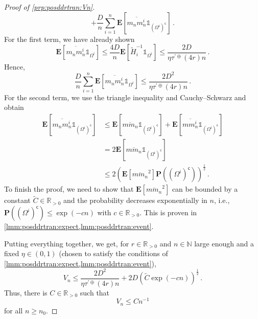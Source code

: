 \documentclass{article}
\newcommand{\N}{\mathbb{N}}
\newcommand{\R}{\mathbb{R}}
\newcommand{\Rpp}{\R_{>0}}
\newcommand{\lab}{\left[} %
\newcommand{\rab}{\right]} %
\newcommand{\ab}[1]{\lab #1 \rab} %
\newcommand{\abOf}[1]{\!\ab{#1}} %
\newcommand{\lb}{\left(} %
\newcommand{\rb}{\right)} %
\newcommand{\br}[1]{\lb #1 \rb} %
\newcommand{\brOf}[1]{\!\br{#1}} %
\renewcommand{\Pr}{\mathbf{P}} %
\newcommand{\PrOf}[1]{\Pr\brOf{#1}}
\newcommand{\E}{\mathbf{E}} %
\newcommand{\EOf}[1]{\E\abOf{#1}}
\newcommand{\compl}{^\mathsf{c}}%
\newcommand{\ind}{\mathds{1}}%
\newcommand{\eqfs}{\,.}
\newcommand{\ol}[2]{\overline{#1#2}}
\newcommand{\ddrtran}{\tau^{\prime\oplus}}
\begin{document}
\begin{proof}[Proof of \cref{prp:posddrtran:Vn}]
\begin{equation}
        +
        \frac D{n}\sum_{i=1}^n \EOf{\ol{m_n}{m_n^{i}} \ind_{(\Omega^i)\compl}}
        \eqfs
    \end{equation}
    For the first term, we have already shown
    \begin{equation}
        \EOf{\ol{m_n}{m_n^{i}} \ind_{\Omega^i}}
        \leq 
        \frac{4D}{n}\EOf{\tilde H_i^{-1} \ind_{\Omega^i}}
        \leq 
        \frac{2D}{\eta\ddrtran(4r)n}
        \eqfs
    \end{equation}
    Hence, 
    \begin{equation}
        \frac D{n}\sum_{i=1}^n \EOf{\ol{m_n}{m_n^{i}} \ind_{\Omega^i}} \leq \frac{2D^2}{\eta\ddrtran(4r)n}
        \eqfs
    \end{equation}
    For the second term, we use the triangle inequality and Cauchy--Schwarz and obtain
    \begin{align}
        \EOf{\ol{m_n}{m_n^{i}} \ind_{(\Omega^i)\compl}}
        &\leq 
        \EOf{\ol{m}{m_n} \ind_{(\Omega^i)\compl}}
        +
        \EOf{\ol{m}{m_n^{i}} \ind_{(\Omega^i)\compl}}
        \\&=
        2 \EOf{\ol{m}{m_n} \ind_{(\Omega^i)\compl}}
        \\&\leq 
        2 \br{\EOf{\ol{m}{m_n}^2} \PrOf{(\Omega^i)\compl}}^{\frac12}
        \eqfs
    \end{align}
    To finish the proof, we need to show that $\EOf{\ol{m}{m_n}^2}$ can be bounded by a constant $\tilde C\in\Rpp$ and the probability decreases exponentially in $n$, i.e., $\PrOf{(\Omega^i)\compl} \leq \exp(-cn)$ with $c\in\Rpp$.
    This is proven in \cref{lmm:posddrtran:expect,lmm:posddrtran:event}.
    
    Putting everything together, we get, for $r\in\Rpp$ and $n\in\N$ large enough and a fixed $\eta\in(0,1)$ (chosen to satisfy the conditions of \cref{lmm:posddrtran:expect,lmm:posddrtran:event}),
    \begin{equation}
        V_n
        \leq 
        \frac{2D^2}{\eta\ddrtran(4r)n}
        +
        2 D \br{\tilde C \exp(-cn)}^{\frac12}
        \eqfs
    \end{equation}
    Thus, there is $C \in \Rpp$ such that
    \begin{equation}
        V_n \leq Cn^{-1}
    \end{equation}
    for all $n \geq n_0$.
\end{proof}
%
\end{document}
